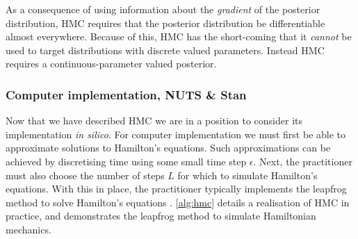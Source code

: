 As a consequence of using information about the \emph{gradient} of the
posterior distribution, HMC requires that the posterior distribution be
differentiable almost everywhere. Because of this, HMC has the short-coming
that it \emph{cannot} be used to target distributions with discrete valued
parameters. Instead HMC requires a continuous-parameter valued posterior.

\subsubsection{Computer implementation, NUTS \& Stan}

Now that we have described HMC we are in a position to consider its
implementation \emph{in silico}. For computer implementation we must first be
able to approximate solutions to Hamilton's equations. Such approximations can
be achieved by discretising time using some small time step $\epsilon$. Next,
the practitioner must also choose the number of steps $L$ for which to simulate
Hamilton's equations. With this in place, the practitioner typically implements
the leapfrog method to solve Hamilton's equations \parencite{neal11}.
\cref{alg:hmc} details a realisation of HMC in practice, and demonstrates the
leapfrog method to simulate Hamiltonian mechanics.


